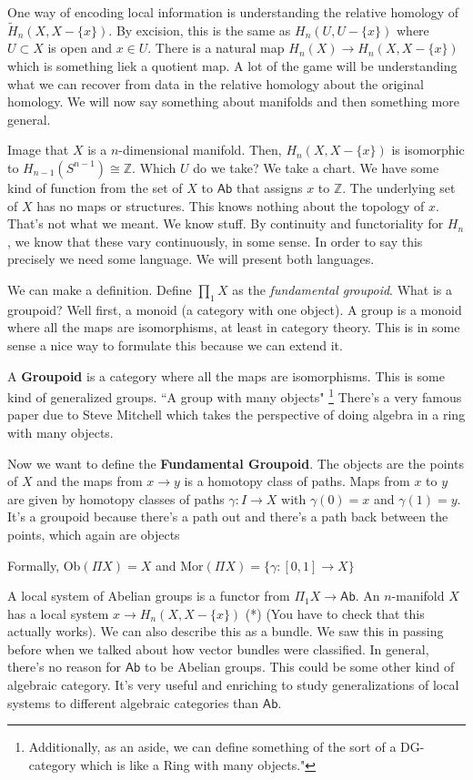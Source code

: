 \documentclass[10pt]{article}
\theoremstyle{definition}
\begin{document}
One way of encoding local information is understanding the relative homology of $\tilde H_n(X,X-\{x\})$. By excision, this is the same as $H_n(U,U-\{x\})$ where $U\subset X$ is open and $x\in U$. There is a natural map $H_n(X)\to H_n(X,X-\{x\})$ which is something liek a quotient map. A lot of the game will be understanding what we can recover from data in the relative homology about the original homology. We will now say something about manifolds and then something more general.

Image that $X$ is a $n$-dimensional manifold. Then, $H_n(X,X-\{x\})$ is isomorphic to $H_{n-1}(S^{n-1})\cong \mathbb{Z}$. Which $U$ do we take? We take a chart. We have some kind of function from the set of $X$ to $\mathsf{Ab}$ that assigns $x$ to $\mathbb Z$. The underlying set of $X$ has no maps or structures. This knows nothing about the topology of $x$. That's not what we meant. We know stuff. By continuity and functoriality for $H_n$, we know that these vary continuously, in some sense. In order to say this precisely we need some language. We will present both languages.

We can make a definition. Define $\prod_1 X$ as the \textit{fundamental groupoid}. What is a groupoid? Well first, a monoid (a category with one  object). A group is a monoid where all the maps are isomorphisms, at least in category theory. This is in some sense a nice way to formulate this because we can extend it. 

A \textbf{Groupoid} is a category where all the maps are isomorphisms. This is some kind of generalized groups. ``A group with many objects" \footnote{Additionally, as an aside, we can define something of the sort of a DG-category which is like a Ring with many objects."} There's a very famous paper due to Steve Mitchell which takes the perspective of doing algebra in a ring with many objects. 

Now we want to define the \textbf{Fundamental Groupoid}. The objects are the points of $X$ and the maps from $x\to y$ is a homotopy class of paths. Maps from $x$ to $y$ are given by homotopy classes of paths $\gamma:I\to X$ with $\gamma(0)=x$ and $\gamma(1)=y$. It's a groupoid because there's a path out and there's a path back between the points, which again are objects

Formally, \textsf{Ob}$(\Pi X)=X$ and \textsf{Mor}$(\Pi X)=\{\gamma:[0,1]\to X\}$ 

A local system of Abelian groups is a functor from $\Pi_1 X\to \mathsf{Ab}$. An $n$-manifold $X$ has a local system  $x\to H_n(X,X-\{x\})$ (*) (You have to check that this actually works). We can also describe this as a bundle. We saw this in passing before when we talked about how vector bundles were classified. In general, there's no reason for $\mathsf{Ab}$ to be Abelian groups. This could be some other kind of algebraic category. It's very useful and enriching to study generalizations of local systems to different algebraic categories than $\mathsf{Ab}$. 
\end{document}
